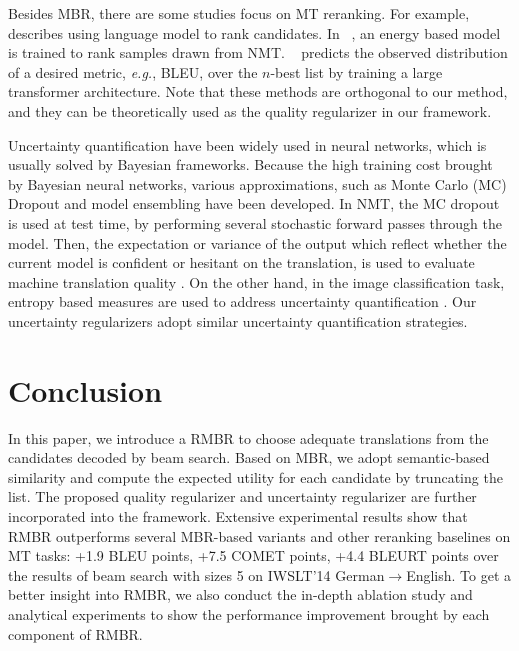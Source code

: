 \documentclass{article}
\begin{document}
Besides MBR, there are some studies focus on MT reranking. For example, \citeauthor{37}~ describes using language model to rank candidates. In \citeauthor{6}~, an energy based model is trained to rank samples drawn from NMT. %
\citeauthor{40}~ predicts the observed distribution of a desired metric, \textit{e.g.}, BLEU, over the $n$-best list by training a large transformer architecture. %
Note that these methods are orthogonal to our method, and they can be theoretically used as the quality regularizer in our framework. 

Uncertainty quantification \cite{16} have been widely used in neural networks, which is usually solved by Bayesian frameworks. Because the high training cost brought by Bayesian neural networks, various approximations, such as Monte Carlo (MC) Dropout \cite{35} and model ensembling \cite{36} have been developed. In NMT, the MC dropout is used at test time, by performing several stochastic forward passes through the model. Then, the expectation or variance of the output which reflect whether the current model is confident or hesitant on the translation, is used to evaluate machine translation quality \cite{17}. On the other hand, in the image classification task, entropy based measures are used to address uncertainty quantification \cite{19}. Our uncertainty regularizers adopt similar uncertainty quantification strategies.


\section{Conclusion}
In this paper, we introduce a RMBR to choose adequate translations from the candidates decoded by beam search. Based on MBR, we adopt semantic-based similarity and compute the expected utility for each candidate by truncating the list. The proposed quality regularizer and uncertainty regularizer are further incorporated into the framework. Extensive experimental results show that RMBR outperforms several MBR-based variants and other reranking baselines on MT tasks: +1.9 BLEU points, +7.5 COMET points, +4.4 BLEURT points over the results of beam search with sizes 5 on IWSLT’14 German$\to$English. To get a better insight into RMBR, we also conduct the in-depth ablation study and analytical experiments to show the performance improvement brought by each component of RMBR. %
\end{document}
